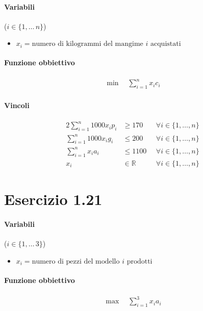 \documentclass{article}
\begin{document}
\paragraph{Variabili} ($i \in \{1,\ldots\,n\}$)
\begin{itemize}
  \item $x_i = \text{numero di kilogrammi del mangime }i\text{ acquistati}$
\end{itemize}

\paragraph{Funzione obbiettivo}
\begin{align*}
  \min \quad \sum_{i=1}^n x_i c_i
\end{align*}

\paragraph{Vincoli}
\begin{alignat}{2}
  \sum_{i=1}^n 1000 x_i p_i &\geq 170 &\forall i \in \{1,\ldots,n\}\\
  \sum_{i=1}^n 1000 x_i g_i &\leq 200 &\forall i \in \{1,\ldots,n\}\\
  \sum_{i=1}^n x_i a_i &\leq 1100 &\forall i \in \{1,\ldots,n\}\\
  x_i &\in \mathbb{R} \qquad &\forall i \in \{1,\ldots,n\}
\end{alignat}

\pagebreak
\section{Esercizio 1.21}

\paragraph{Variabili} ($i \in \{1,\ldots\,3\}$)
\begin{itemize}
  \item $x_i = \text{numero di pezzi del modello }i\text{ prodotti}$
\end{itemize}

\paragraph{Funzione obbiettivo}
\begin{align*}
  \max \quad \sum_{i=1}^3 x_i a_i
\end{align*}
\end{document}
